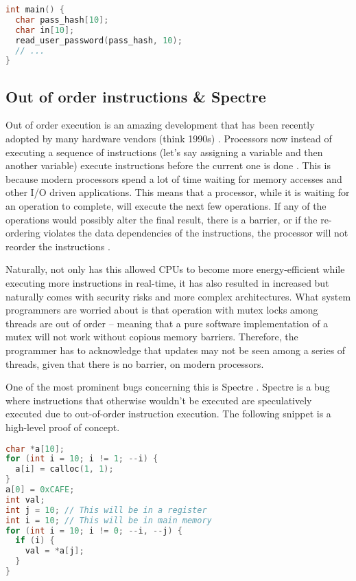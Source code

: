 \begin{lstlisting}[language=C]
int main() {
  char pass_hash[10];
  char in[10];
  read_user_password(pass_hash, 10);
  // ...
}
\end{lstlisting}

\subsection{Out of order instructions \& Spectre}

Out of order execution is an amazing development that has been recently adopted by many hardware vendors (think 1990s) .
Processors now instead of executing a sequence of instructions (let's say assigning a variable and then another variable) execute instructions before the current one is done \cite[P. 45]{guide2011intel}.
This is because modern processors spend a lot of time waiting for memory accesses and other I/O driven applications.
This means that a processor, while it is waiting for an operation to complete, will execute the next few operations.
If any of the operations would possibly alter the final result, there is a barrier, or if the re-ordering violates the data dependencies of the instructions, the processor will not reorder the instructions \cite[P. 296]{guide2011intel}.

Naturally, not only has this allowed CPUs to become more energy-efficient while executing more instructions in real-time, it has also resulted in increased but naturally comes with security risks and more complex architectures.
What system programmers are worried about is that operation with mutex locks among threads are out of order -- meaning that a pure software implementation of a mutex will not work without copious memory barriers.
Therefore, the programmer has to acknowledge that updates may not be seen among a series of threads, given that there is no barrier, on modern processors.

One of the most prominent bugs concerning this is Spectre \cite{kocher2018spectre}.
Spectre is a bug where instructions that otherwise wouldn't be executed are speculatively executed due to out-of-order instruction execution.
The following snippet is a high-level proof of concept.

\begin{lstlisting}[language=C]
char *a[10];
for (int i = 10; i != 1; --i) {
  a[i] = calloc(1, 1);
}
a[0] = 0xCAFE;
int val;
int j = 10; // This will be in a register
int i = 10; // This will be in main memory
for (int i = 10; i != 0; --i, --j) {
  if (i) {
    val = *a[j];
  }
}
\end{lstlisting}

